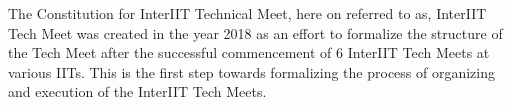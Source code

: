 The Constitution for InterIIT Technical Meet, here on referred to as, InterIIT Tech Meet was created in the year 2018 as an effort to formalize the structure of the Tech Meet after the successful commencement of 6 InterIIT Tech Meets at various IITs. This is the first step towards formalizing the process of organizing and execution of the InterIIT Tech Meets.
